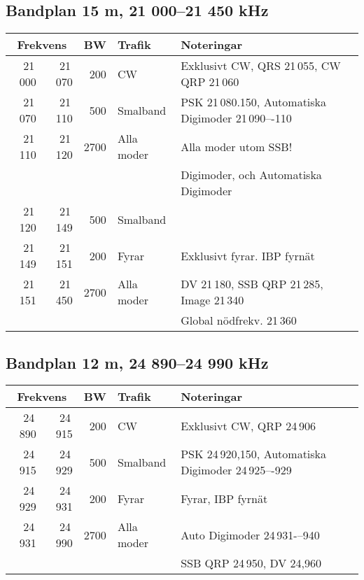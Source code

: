 \subsection{Bandplan 15 m, 21 000--21 450 kHz}
\begin{tabular}{rrrll}
\multicolumn{2}{c}{\textbf{Frekvens}} & \textbf{BW} & \textbf{Trafik} & \textbf{Noteringar} \\ \hline

21\,000 & 21\,070 & 200  & CW         & Exklusivt CW, QRS 21\,055, CW QRP 21\,060           \\ \hline
21\,070 & 21\,110 & 500  & Smalband   & PSK 21\,080.150, Automatiska Digimoder 21\,090–-110 \\
21\,110 & 21\,120 & 2700 & Alla moder & Alla moder utom SSB!                                \\
        &         &      &            & Digimoder, och Automatiska Digimoder                \\ \hline
21\,120 & 21\,149 & 500  & Smalband   &                                                     \\ \hline
21\,149 & 21\,151 & 200  & Fyrar      & Exklusivt fyrar. IBP fyrnät                         \\ \hline
21\,151 & 21\,450 & 2700 & Alla moder & DV 21\,180, SSB QRP 21\,285, Image 21\,340          \\
        &         &      &            & Global nödfrekv. 21\,360                            \\ \hline
\end{tabular}

\subsection{Bandplan 12 m, 24 890--24 990 kHz}
\begin{tabular}{rrrll}
\multicolumn{2}{c}{\textbf{Frekvens}} & \textbf{BW} & \textbf{Trafik} & \textbf{Noteringar} \\ \hline
24\,890 & 24\,915 & 200  & CW         & Exklusivt CW, QRP 24\,906                             \\ \hline
24\,915 & 24\,929 & 500  & Smalband   & PSK 24\,920,150, Automatiska Digimoder 24\,925–-929 \\ \hline
24\,929 & 24\,931 & 200  & Fyrar      & Fyrar, IBP fyrnät                                    \\ \hline
24\,931 & 24\,990 & 2700 & Alla moder & Auto Digimoder 24\,931-–940                        \\
       &        &      &            & SSB QRP 24\,950, DV 24,960                            \\ \hline
\end{tabular}

